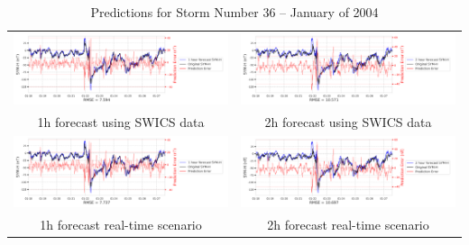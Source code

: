 \documentclass[draft,sw]{agutexSI2019}
\begin{document}
\begin{table}
\centering
\begin{tabular}{cc}
\includegraphics[width=0.49\linewidth]{paper_plots_shade/1h_swics/1h_swics_storm_36.png}
&
\includegraphics[width=0.49\linewidth]{paper_plots_shade/2h_swics/2h_swics_storm_36.png}
\\
1h forecast using SWICS data & 2h forecast using SWICS data
\vspace*{12pt}
\\
\includegraphics[width=0.49\linewidth]{paper_plots_shade/1h_rt/1h_rt_storm_36.png}
&
\includegraphics[width=0.49\linewidth]{paper_plots_shade/2h_rt/2h_rt_storm_36.png}
\\
1h forecast real-time scenario & 2h forecast real-time scenario 
\vspace*{12pt}
\\
\end{tabular}
\caption{Predictions for Storm Number 36 -- January of 2004}
\label{storm-36}
\end{table}
\end{document}
